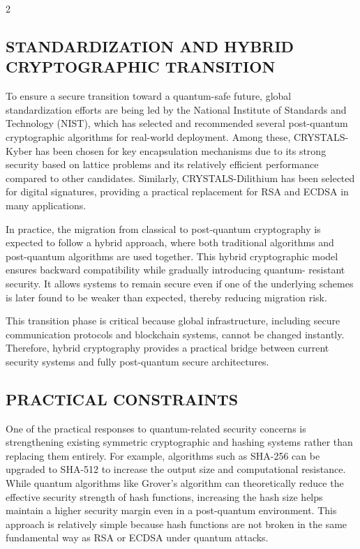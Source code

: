 \begin{multicols}{2}
  \subsection*{\centering\uppercase{Standardization and Hybrid Cryptographic Transition}}
  To ensure a secure transition toward a quantum-safe future, global standardization efforts are being
  led by the National Institute of Standards and Technology (NIST), which has selected and
  recommended several post-quantum cryptographic algorithms for real-world deployment. Among
  these, CRYSTALS-Kyber has been chosen for key encapsulation mechanisms due to its strong
  security based on lattice problems and its relatively efficient performance compared to other
  candidates. Similarly, CRYSTALS-Dilithium has been selected for digital signatures, providing a
  practical replacement for RSA and ECDSA in many applications.

  \noindent
  In practice, the migration from classical to post-quantum cryptography is expected to follow a hybrid
  approach, where both traditional algorithms and post-quantum algorithms are used together. This
  hybrid cryptographic model ensures backward compatibility while gradually introducing quantum-
  resistant security. It allows systems to remain secure even if one of the underlying schemes is later
  found to be weaker than expected, thereby reducing migration risk.

  \noindent
  This transition phase is critical because global infrastructure, including secure communication
  protocols and blockchain systems, cannot be changed instantly. Therefore, hybrid cryptography
  provides a practical bridge between current security systems and fully post-quantum secure
  architectures.

  \subsection*{\centering\uppercase{Practical Constraints}}
  One of the practical responses to quantum-related security concerns is strengthening existing
  symmetric cryptographic and hashing systems rather than replacing them entirely. For example,
  algorithms such as SHA-256 can be upgraded to SHA-512 to increase the output size and
  computational resistance. While quantum algorithms like Grover’s algorithm can theoretically reduce
  the effective security strength of hash functions, increasing the hash size helps maintain a higher
  security margin even in a post-quantum environment. This approach is relatively simple because hash
  functions are not broken in the same fundamental way as RSA or ECDSA under quantum attacks.


\end{multicols}
